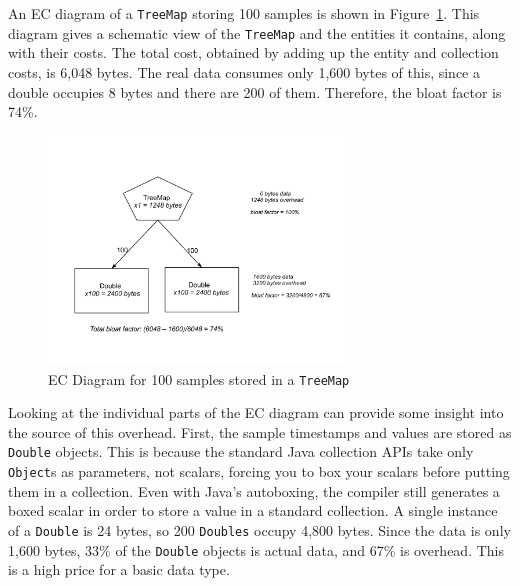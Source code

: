 An EC diagram of a \texttt{TreeMap} storing 100 samples is shown in Figure~\ref{fig:content-schematic-treemap-doubles}.  This diagram gives a schematic view of the \texttt{TreeMap} and the entities it contains, along with their costs. The total cost, obtained by adding up the entity and collection costs, is 6,048 bytes. The real data consumes only 1,600 bytes of this, since a double occupies 8 bytes and there are 200 of them. Therefore, the bloat factor is 74\%.  

\begin{figure}
  \centering
  \includegraphics[width=0.7\textwidth]{part1/Figures/memoryhealth/treemap-doubles}
  \caption{EC Diagram for 100 samples stored in a \texttt{TreeMap}}
  \label{fig:content-schematic-treemap-doubles}
\end{figure} 
 
Looking at the individual parts of the EC diagram can provide some insight into the source of this overhead. First, the sample timestamps and values are stored as \texttt{Double} objects. This is because the standard Java collection APIs take only \texttt{Object}s as parameters, not scalars, forcing you to box your scalars before putting them in a collection. Even with Java's autoboxing, the compiler still generates a boxed scalar in order to store a value in a standard collection.  A single instance of a \texttt{Double} is 24 bytes, so 200 \texttt{Doubles} occupy 4,800 bytes. Since the data is only 1,600 bytes,  33\% of the \texttt{Double} objects is actual data, and 67\% is overhead. This is a high price for a basic data type. 



